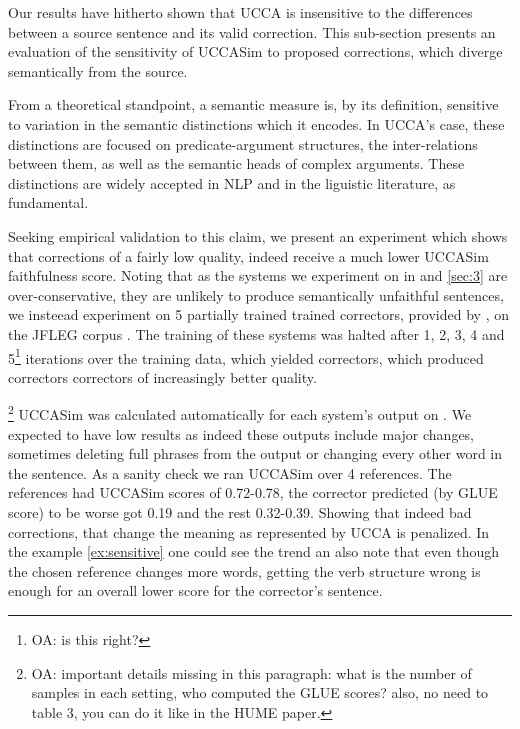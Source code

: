 \documentclass[letterpaper, 11pt]{article}
\newcommand{\oa}[1]{\footnote{\color{red}OA: #1}}
\begin{document}
Our results have hitherto shown that UCCA is insensitive to the differences between a source sentence
and its valid correction. This sub-section presents an evaluation of the sensitivity of UCCASim
to proposed corrections, which diverge semantically from the source.


From a theoretical standpoint, a semantic measure is, by its definition, sensitive to variation in
the semantic distinctions which it encodes. 
In UCCA's case, these distinctions are focused on predicate-argument structures, the inter-relations between them,
as well as the semantic heads of complex arguments.
These distinctions are widely accepted in NLP and in the liguistic literature, as fundamental.

Seeking empirical validation to this claim, we present an experiment which shows that corrections
of a fairly low quality, indeed receive a much lower UCCASim faithfulness score. Noting that as the
systems we experiment on in  and \ref{sec:3} are over-conservative, they are unlikely
to produce semantically unfaithful sentences, we insteead experiment on 5 partially trained
trained correctors, provided by , on the
JFLEG corpus \cite{napoles2017jfleg}. The training of these systems was halted after 1, 2, 3, 4 and 5\oa{is this
  right?} iterations over the training data, which yielded correctors, which produced correctors correctors
of increasingly better quality. 

\oa{important details missing in this paragraph: what is the number of samples in each setting, who computed the GLUE scores? also, no need to table 3, you can do it like in the HUME paper.}
  {\sc UCCASim} was calculated automatically for each system's output on . We expected to have low results as indeed these outputs include major changes, sometimes deleting full phrases from the output or changing every other word in the sentence. As a sanity check we ran {\sc UCCASim} over 4 references. The references had {\sc UCCASim} scores of 0.72-0.78, the corrector predicted (by GLUE score) to be worse got 0.19 and the rest 0.32-0.39. Showing that indeed bad corrections, that change the meaning as represented by UCCA is penalized. In the example \ref{ex:sensitive} one could see the trend an also note that even though the chosen reference changes more words, getting the verb structure wrong is enough for an overall lower score for the corrector's sentence.
\end{document}
